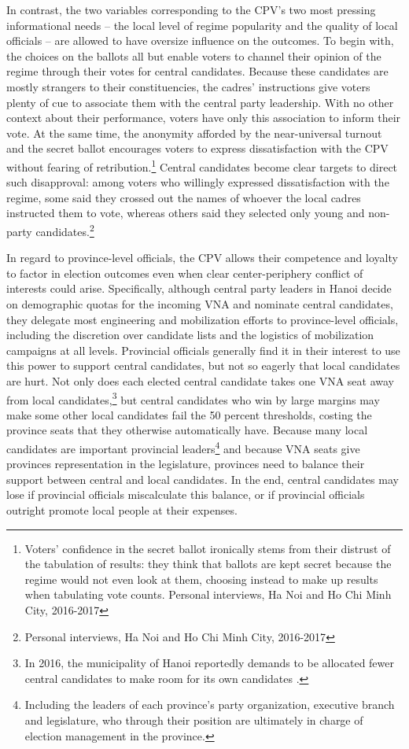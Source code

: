 \documentclass[12pt]{article}
\newcommand{\1}{\mathbbm{1}}
\begin{document}
In contrast, the two variables corresponding to the CPV's two most pressing informational needs -- the local level of regime popularity and the quality of local officials -- are allowed to have oversize influence on the outcomes. To begin with, the choices on the ballots all but enable voters to channel their opinion of the regime through their votes for central candidates. Because these candidates are mostly strangers to their constituencies, the cadres' instructions give voters plenty of cue to associate them with the central party leadership. With no other context about their performance, voters have only this association to inform their vote. At the same time, the anonymity afforded by the near-universal turnout and the secret ballot encourages voters to express dissatisfaction with the CPV without fearing of retribution.\footnote{Voters' confidence in the secret ballot ironically stems from their distrust of the tabulation of results: they think that ballots are kept secret because the regime would not even look at them, choosing instead to make up results when tabulating vote counts. Personal interviews, Ha Noi and Ho Chi Minh City, 2016-2017} Central candidates become clear targets to direct such disapproval: among voters who willingly expressed dissatisfaction with the regime, some said they crossed out the names of whoever the local cadres instructed them to vote, whereas others said they selected only young and non-party candidates.\footnote{Personal interviews, Ha Noi and Ho Chi Minh City, 2016-2017}

In regard to province-level officials, the CPV allows their competence and loyalty to factor in election outcomes even when clear center-periphery conflict of interests could arise. Specifically, although central party leaders in Hanoi decide on demographic quotas for the incoming VNA and nominate central candidates, they delegate most engineering and mobilization efforts to province-level officials, including the discretion over candidate lists and the logistics of mobilization campaigns at all levels. Provincial officials generally find it in their interest to use this power to support central candidates, but not so eagerly that local candidates are hurt. Not only does each elected central candidate takes one VNA seat away from local candidates,\footnote{In 2016, the municipality of Hanoi reportedly demands to be allocated fewer central candidates to make room for its own candidates \citep{vnexpress2016_2}.} but central candidates who win by large margins may make some other local candidates fail the 50 percent thresholds, costing the province seats that they otherwise automatically have. Because many local candidates are important provincial leaders\footnote{Including the leaders of each province's party organization, executive branch and legislature, who through their position are ultimately in charge of election management in the province.} and because VNA seats give provinces representation in the legislature, provinces need to balance their support between central and local candidates. In the end, central candidates may lose if provincial officials miscalculate this balance, or if provincial officials outright promote local people at their expenses.
\end{document}
